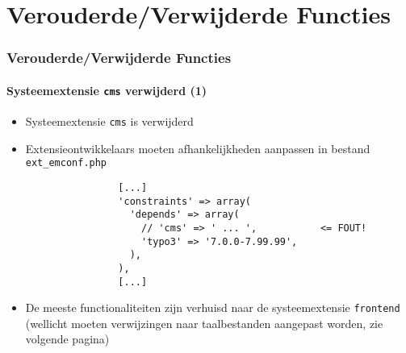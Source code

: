 %

\section{Verouderde/Verwijderde Functies}


\begin{frame}[fragile]
	\frametitle{Verouderde/Verwijderde Functies}
	\framesubtitle{Systeemextensie \texttt{cms} verwijderd (1)}

	\lstset{basicstyle=\tiny\ttfamily}

	\begin{itemize}

		\item Systeemextensie \texttt{cms} is verwijderd

		\item Extensieontwikkelaars moeten afhankelijkheden aanpassen in bestand \texttt{ext\_emconf.php}

			\begin{lstlisting}
				[...]
				'constraints' => array(
				  'depends' => array(
				    // 'cms' => ' ... ',           <= FOUT!
				    'typo3' => '7.0.0-7.99.99',
				  ),
				),
				[...]
			\end{lstlisting}

		\item De meeste functionaliteiten zijn verhuisd naar de systeemextensie \texttt{frontend}
			(wellicht moeten verwijzingen naar taalbestanden aangepast worden, zie volgende pagina)

	\end{itemize}

\end{frame}

